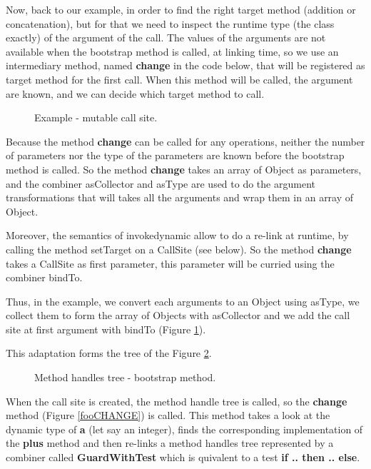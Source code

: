 \documentclass{sig-alternate}
\begin{document}
      Now, back to our example, in order to find the right target method (addition or concatenation),
      but for that we need to inspect the runtime type (the class exactly) of the argument of the call.
      The values of the arguments are not available when the bootstrap method is called, at linking time,
      so we use an intermediary method, named {\bf change} in the code below, that will be registered as
      target method for the first call. When this method will be called, the argument are known, and
      we can decide which target method to call.

      \begin{figure}[!h]
        \centering \vspace{-1.5em}
        \caption{Example - mutable call site.}
        \label{fooMCS}
      \end{figure}

      Because the method {\bf change} can be called for any operations, neither the number of parameters nor the type
      of the parameters are known before the bootstrap method is called. So the method {\bf change} takes an array of
      Object as parameters, and the combiner asCollector and asType are used to do the argument transformations
      that will takes all the arguments and wrap them in an array of Object.

      Moreover, the semantics of invokedynamic allow to do a re-link at runtime, by calling the method setTarget
      on a CallSite (see below). So the method {\bf change} takes a CallSite as first parameter, this parameter
      will be curried using the combiner bindTo.
       
      Thus, in the example, we convert each arguments to an Object using asType,
      we collect them to form the array of Objects with asCollector and
      we add the call site at first argument with bindTo (Figure \ref{fooMCS}).

      \noindent This adaptation forms the tree of the Figure \ref{ast1}.

      \begin{figure}[!h]
        \centering \resizebox{.7\linewidth}{!}{}
        \caption{Method handles tree - bootstrap method.}\vspace{-1em}
        \label{ast1}
      \end{figure}

      When the call site is created, the method handle tree is called, so the {\bf change} method (Figure \ref{fooCHANGE}) is called.
      This method takes a look at the dynamic type of {\bf a} (let say an integer),
      finds the corresponding implementation of the {\bf plus} method
      and then re-links a method handles tree represented by a combiner called {\bf GuardWithTest}
      which is quivalent to a test {\bf if .. then .. else}.
\end{document}
